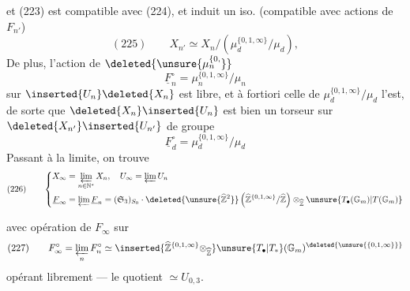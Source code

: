 et  (223) est compatible avec (224), et induit un iso. (compatible avec actions de $F_{n'}$)
\[
(225)\qquad X_{n'}\simeq X_n/(\mu_d^{\{0,1,\infty\}}/\mu_d),
\]
De plus, l'action de $\deleted{\unsure{\mu_n^{\{0,}}}$
\[
\underline F_n^{\circ}=\mu_n^{\{0,1,\infty\}}/\mu_n
\]
sur $\inserted{U_n}\deleted{X_n}$ est libre, et à fortiori celle de $\mu_d^{\{0,1,\infty\}}/\mu_d$ l'est, de sorte que $\deleted{X_n}\inserted{U_n}$ est bien un torseur sur $\deleted{X_{n'}}\inserted{U_{n'}}$ de groupe
\[
\underline F_d^{\circ}=\mu_d^{\{0,1,\infty\}}/\mu_d
\]
Passant à la limite, on trouve
\[
(226)\qquad\left\{\begin{aligned}
X_{\infty}&=\varprojlim_{n\in\mathbb N^{*}}X_n,\quad U_{\infty}=\varprojlim U_n\\
\underline F_{\infty}&=\varprojlim\underline F_n=(\mathfrak S_3)_{S_0}\mathbin{\cdot}\deleted{\unsure{\widehat{\mathbb Z}^{2}}}\left(\widehat{\mathbb Z}^{\{0,1,\infty\}}/\widehat{\mathbb Z}\right)\otimes_{\widehat{\mathbb Z}}\unsure{T_{\bullet}(\mathbb G_m)|T(\mathbb G_m)}
\end{aligned}\right.
\]


avec opération de $F_\infty$ sur 
\[
(227)\qquad F_\infty^\circ=\varprojlim_n F_n^\circ\simeq
\inserted{\widehat{\mathbb Z}^{\{0,1,\infty\}}\otimes_{\widehat{\mathbb Z}}}
\unsure{T_\bullet|T_*}(\mathbb G_m)^{\deleted{\unsure{\{0,1,\infty\}}}}
\]
opérant librement  --- le quotient 
$\simeq U_{0,3}$.

